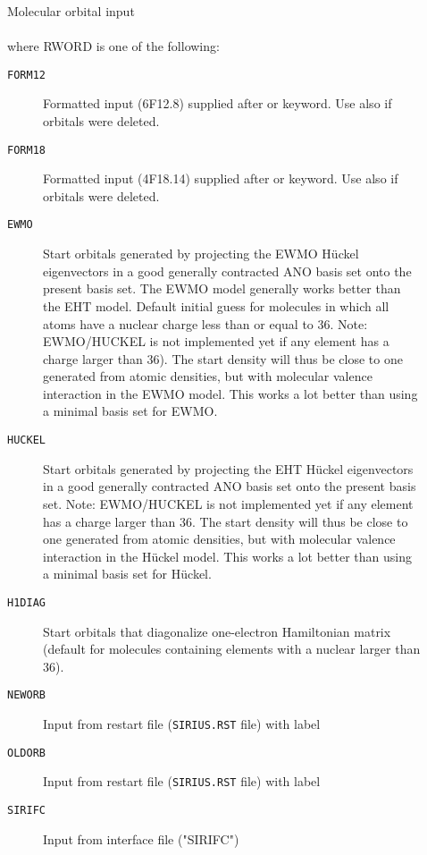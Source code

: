 \begin{description}
\item[]
   Molecular orbital input\\
    \\
   where RWORD is one of the following:
   \begin{description}
   \item[{\tt FORM12\ }] Formatted input (6F12.8)  supplied after
         or  keyword. Use also 
        if orbitals were deleted.
   \item[{\tt FORM18\ }] Formatted input (4F18.14) supplied after
         or  keyword. Use also 
        if orbitals were deleted.
   \item[{\tt EWMO\ }] Start orbitals generated by projecting the EWMO
        H{\"u}ckel eigenvectors in a good generally contracted ANO basis set
        onto the present basis set.
        The EWMO model generally works better than the EHT model.
        Default initial guess for molecules in which all atoms have a nuclear charge
        less than or equal to 36.
        Note: EWMO/HUCKEL is not implemented yet if any element has a
        charge larger than 36).
        The start density will thus be close to one generated from atomic densities,
        but with molecular valence interaction in the EWMO model.
        This works a lot better than using a minimal basis set for EWMO.
   \item[{\tt HUCKEL\ }] Start orbitals generated by projecting the EHT
        H{\"u}ckel eigenvectors in a good generally contracted ANO basis set
        onto the present basis set.
        Note: EWMO/HUCKEL is not implemented yet if any element has a
        charge larger than 36.
        The start density will thus be close to one generated from atomic densities,
        but with molecular valence interaction in the H{\"u}ckel model.
        This works a lot better than using a minimal basis set for H{\"u}ckel.
   \item[{\tt H1DIAG\ }] Start orbitals that diagonalize
        one-electron Hamiltonian matrix (default
        for molecules containing elements with a nuclear larger than 36).
   \item[{\tt NEWORB\ }] Input from {\sir} restart file
                            (\verb|SIRIUS.RST| file) with label 
   \item[{\tt OLDORB\ }] Input from {\sir} restart file
                            (\verb|SIRIUS.RST| file) with label 
   \item[{\tt SIRIFC\ }] Input from {\sir} interface file ("SIRIFC")
\end{description}


\end{description}
